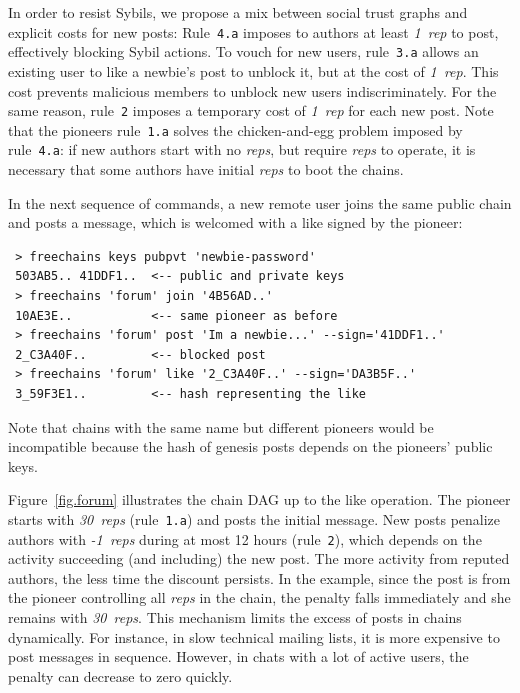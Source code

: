 \documentclass[12pt]{article}
\newcommand{\reps}     {\emph{reps}\xspace}
\newcommand{\onerep}   {\emph{1~rep}\xspace}
\newcommand{\nreps}[1] {\emph{#1~reps\xspace}}
\newcommand{\code}[1]  {\texttt{\footnotesize{#1}}}
\begin{document}
%
%
In order to resist Sybils, we propose a mix between social trust
graphs and explicit costs for new posts:
Rule~\code{4.a} imposes to authors at least \onerep to post,
effectively blocking Sybil actions.
To vouch for new users, rule~\code{3.a} allows an existing user to like a
newbie's post to unblock it, but at the cost of \onerep.
This cost prevents malicious members to unblock new users indiscriminately.
For the same reason, rule~\code{2} imposes a temporary cost of \onerep for
each new post.
%
Note that the pioneers rule~\code{1.a} solves the chicken-and-egg problem
imposed by rule~\code{4.a}: if new authors start with no \reps, but require
\reps to operate, it is necessary that some authors have initial \reps to boot
the chains.

In the next sequence of commands, a new remote user joins the same public chain
and posts a message, which is welcomed with a like signed by the pioneer:

{\footnotesize
\begin{verbatim}
 > freechains keys pubpvt 'newbie-password'
 503AB5.. 41DDF1..  <-- public and private keys
 > freechains 'forum' join '4B56AD..'
 10AE3E..           <-- same pioneer as before
 > freechains 'forum' post 'Im a newbie...' --sign='41DDF1..'
 2_C3A40F..         <-- blocked post
 > freechains 'forum' like '2_C3A40F..' --sign='DA3B5F..'
 3_59F3E1..         <-- hash representing the like
\end{verbatim}
}

Note that chains with the same name but different pioneers would be
incompatible because the hash of genesis posts depends on the pioneers' public
keys.

Figure~\ref{fig.forum} illustrates the chain DAG up to the like operation.
The pioneer starts with \nreps{30} (rule~\code{1.a}) and posts the initial
message.
%
New posts penalize authors with \nreps{-1} during at most 12 hours
(rule~\code{2}), which depends on the activity succeeding (and including) the
new post.
The more activity from reputed authors, the less time the discount persists.
In the example, since the post is from the pioneer controlling all \reps in the
chain, the penalty falls immediately and she remains with \nreps{30}.
This mechanism limits the excess of posts in chains dynamically.
For instance, in slow technical mailing lists, it is more expensive to post
messages in sequence.
However, in chats with a lot of active users, the penalty can decrease to zero
quickly.
\end{document}
